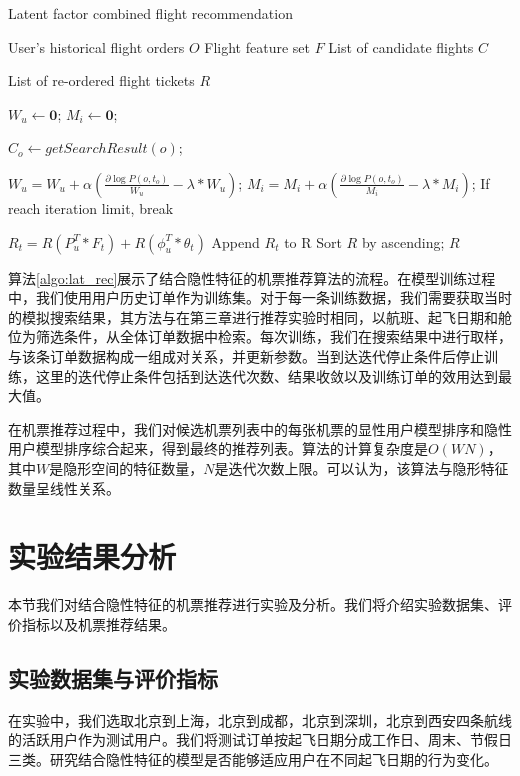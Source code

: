 \begin{algorithm}
\caption{Latent factor combined flight recommendation}
\label{algo:lat_rec}
\begin{algorithmic}[1]
\Require
\Statex User's historical flight orders $O$
\Statex Flight feature set $F$
\Statex List of candidate flights $C$

\Ensure 
\Statex List of re-ordered flight tickets $R$

\State $W_u \gets \mathbf{0}$;
\State $M_i \gets \mathbf{0}$;


\State $C_o \gets getSearchResult(o)$;

\State $W_u = W_u + \alpha(\frac{\partial \log P(o,t_o)}{W_u} - \lambda*W_u)$;
\State $M_i = M_i + \alpha(\frac{\partial \log P(o,t_o)}{M_i} - \lambda*M_i)$;
\EndFor
\State If reach iteration limit, break
\EndFor

\State $R_t = R(P_u^T * F_t) + R(\phi_u^T * \theta_t)$
\State Append $R_t$ to R
\EndFor 
\State Sort $R$ by ascending;
\State \Return $R$
\end{algorithmic}
\end{algorithm}

算法\ref{algo:lat_rec}展示了结合隐性特征的机票推荐算法的流程。在模型训练过程中，我们使用用户历史订单作为训练集。对于每一条训练数据，我们需要获取当时的模拟搜索结果，其方法与在第三章进行推荐实验时相同，以航班、起飞日期和舱位为筛选条件，从全体订单数据中检索。每次训练，我们在搜索结果中进行取样，与该条订单数据构成一组成对关系，并更新参数。当到达迭代停止条件后停止训练，这里的迭代停止条件包括到达迭代次数、结果收敛以及训练订单的效用达到最大值。

在机票推荐过程中，我们对候选机票列表中的每张机票的显性用户模型排序和隐性用户模型排序综合起来，得到最终的推荐列表。算法的计算复杂度是$O(WN)$，其中$W$是隐形空间的特征数量，$N$是迭代次数上限。可以认为，该算法与隐形特征数量呈线性关系。


\section{实验结果分析}

本节我们对结合隐性特征的机票推荐进行实验及分析。我们将介绍实验数据集、评价指标以及机票推荐结果。

\subsection{实验数据集与评价指标}
在实验中，我们选取北京到上海，北京到成都，北京到深圳，北京到西安四条航线的活跃用户作为测试用户。我们将测试订单按起飞日期分成工作日、周末、节假日三类。研究结合隐性特征的模型是否能够适应用户在不同起飞日期的行为变化。

